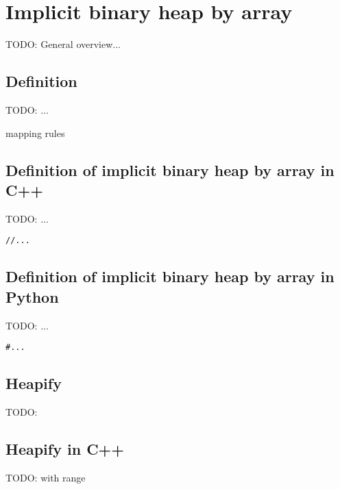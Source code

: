 \documentclass{article}
\begin{document}
\section{Implicit binary heap by array}
\label{ibheap}

TODO: General overview...

\subsection{Definition}

TODO: ...

mapping rules

\subsection*{Definition of implicit binary heap by array in C++}
TODO: ...

\lstset{language=C++}
\begin{lstlisting}
//...
\end{lstlisting}

\subsection*{Definition of implicit binary heap by array in Python}
TODO: ...

\lstset{language=Python}
\begin{lstlisting}
#...
\end{lstlisting}

\subsection{Heapify}

TODO:

\subsection*{Heapify in C++}

TODO: with range
\end{document}
